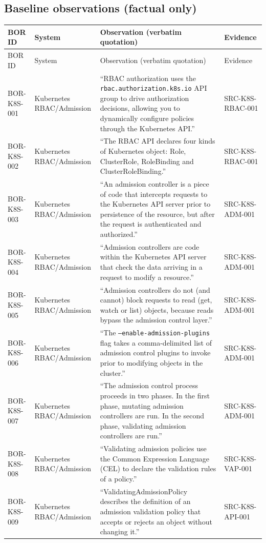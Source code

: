 \documentclass{article}
\begin{document}
\subsection*{Baseline observations (factual only)}
\begin{longtable}{@{}p{}p{}p{}p{}@{}}
\toprule
BOR ID & System & Observation (verbatim quotation) & Evidence\\
\midrule
\endfirsthead
\toprule
BOR ID & System & Observation (verbatim quotation) & Evidence\\
\midrule
\endhead
BOR-K8S-001 & Kubernetes RBAC/Admission & ``RBAC authorization uses the \texttt{rbac.authorization.k8s.io} API group to drive authorization decisions, allowing you to dynamically configure policies through the Kubernetes API.'' & SRC-K8S-RBAC-001\\
BOR-K8S-002 & Kubernetes RBAC/Admission & ``The RBAC API declares four kinds of Kubernetes object: Role, ClusterRole, RoleBinding and ClusterRoleBinding.'' & SRC-K8S-RBAC-001\\
BOR-K8S-003 & Kubernetes RBAC/Admission & ``An admission controller is a piece of code that intercepts requests to the Kubernetes API server prior to persistence of the resource, but after the request is authenticated and authorized.'' & SRC-K8S-ADM-001\\
BOR-K8S-004 & Kubernetes RBAC/Admission & ``Admission controllers are code within the Kubernetes API server that check the data arriving in a request to modify a resource.'' & SRC-K8S-ADM-001\\
BOR-K8S-005 & Kubernetes RBAC/Admission & ``Admission controllers do not (and cannot) block requests to read (get, watch or list) objects, because reads bypass the admission control layer.'' & SRC-K8S-ADM-001\\
BOR-K8S-006 & Kubernetes RBAC/Admission & ``The \texttt{--enable-admission-plugins} flag takes a comma-delimited list of admission control plugins to invoke prior to modifying objects in the cluster.'' & SRC-K8S-ADM-001\\
BOR-K8S-007 & Kubernetes RBAC/Admission & ``The admission control process proceeds in two phases. In the first phase, mutating admission controllers are run. In the second phase, validating admission controllers are run.'' & SRC-K8S-ADM-001\\
BOR-K8S-008 & Kubernetes RBAC/Admission & ``Validating admission policies use the Common Expression Language (CEL) to declare the validation rules of a policy.'' & SRC-K8S-VAP-001\\
BOR-K8S-009 & Kubernetes RBAC/Admission & ``ValidatingAdmissionPolicy describes the definition of an admission validation policy that accepts or rejects an object without changing it.'' & SRC-K8S-API-001\\
\bottomrule
\end{longtable}
\end{document}
